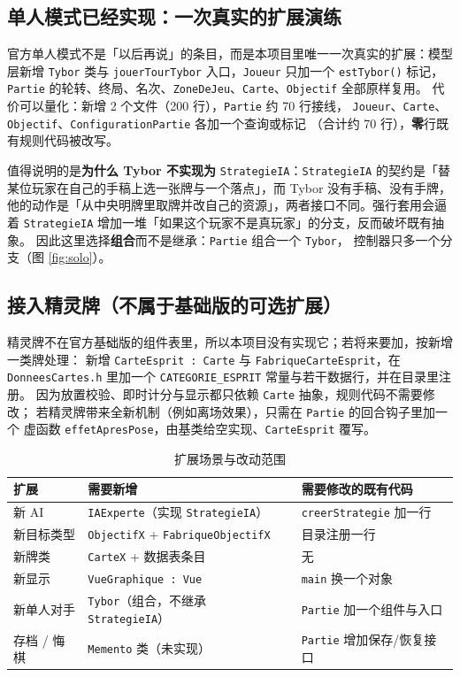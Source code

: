 \documentclass[11pt,a4paper]{ctexart}
\newcommand{\cl}[1]{\texttt{#1}}
\begin{document}
\subsection{单人模式已经实现：一次真实的扩展演练}
官方单人模式不是「以后再说」的条目，而是本项目里唯一一次真实的扩展：模型层新增
\cl{Tybor} 类与 \cl{jouerTourTybor} 入口，\cl{Joueur} 只加一个 \cl{estTybor()} 标记，
\cl{Partie} 的轮转、终局、名次、\cl{ZoneDeJeu}、\cl{Carte}、\cl{Objectif} 全部原样复用。
代价可以量化：新增 2 个文件（200 行），\cl{Partie} 约 70 行接线，
\cl{Joueur}、\cl{Carte}、\cl{Objectif}、\cl{ConfigurationPartie} 各加一个查询或标记
（合计约 70 行），\textbf{零}行既有规则代码被改写。

值得说明的是\textbf{为什么 Tybor 不实现为} \cl{StrategieIA}：\cl{StrategieIA}
的契约是「替某位玩家在自己的手稿上选一张牌与一个落点」，而 Tybor 没有手稿、没有手牌，
他的动作是「从中央明牌里取牌并改自己的资源」，两者接口不同。强行套用会逼着
\cl{StrategieIA} 增加一堆「如果这个玩家不是真玩家」的分支，反而破坏既有抽象。
因此这里选择\textbf{组合}而不是继承：\cl{Partie} 组合一个 \cl{Tybor}，
控制器只多一个分支（图 \ref{fig:solo}）。

\subsection{接入精灵牌（不属于基础版的可选扩展）}
精灵牌不在官方基础版的组件表里，所以本项目没有实现它；若将来要加，按新增一类牌处理：
新增 \cl{CarteEsprit : Carte} 与 \cl{FabriqueCarteEsprit}，在 \cl{DonneesCartes.h}
里加一个 \cl{CATEGORIE\_ESPRIT} 常量与若干数据行，并在目录里注册。
因为放置校验、即时计分与显示都只依赖 \cl{Carte} 抽象，规则代码不需要修改；
若精灵牌带来全新机制（例如离场效果），只需在 \cl{Partie} 的回合钩子里加一个
虚函数 \cl{effetApresPose}，由基类给空实现、\cl{CarteEsprit} 覆写。

\begin{table}[h]
\centering
\small
\begin{tabular}{p{2.8cm}p{6.2cm}p{5.2cm}}
\toprule
扩展 & 需要新增 & 需要修改的既有代码 \\
\midrule
新 AI & \cl{IAExperte}（实现 \cl{StrategieIA}） & \cl{creerStrategie} 加一行 \\
新目标类型 & \cl{ObjectifX} + \cl{FabriqueObjectifX} & 目录注册一行 \\
新牌类 & \cl{CarteX} + 数据表条目 & 无 \\
新显示 & \cl{VueGraphique : Vue} & \cl{main} 换一个对象 \\
新单人对手 & \cl{Tybor}（组合，不继承 \cl{StrategieIA}） & \cl{Partie} 加一个组件与入口 \\
存档 / 悔棋 & \cl{Memento} 类（未实现） & \cl{Partie} 增加保存/恢复接口 \\
\bottomrule
\end{tabular}
\caption{扩展场景与改动范围}
\label{tab:extensions}
\end{table}
\end{document}
